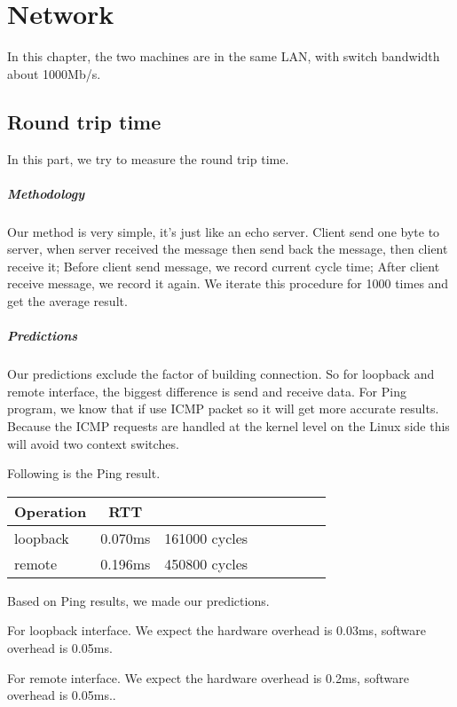 \chapter{Network}
In this chapter, the two machines are in the same LAN, with switch bandwidth about 1000Mb/s.

\section{Round trip time}
In this part, we try to measure the round trip time.

\paragraph{Methodology}
Our method is very simple, it's just like an echo server. Client send one byte to server, when server received the message then send back the message, then client receive it;
Before client send message, we record current cycle time; After client receive message, we record it again. We iterate this procedure for 1000 times and get the average result.


\paragraph{Predictions}
Our predictions exclude the factor of building connection. So for loopback and remote interface, the biggest difference is send and receive data.
For Ping program, we know that if use ICMP packet so it will get more accurate results. Because the ICMP requests are handled at the kernel level on the Linux side this will avoid two context switches.

Following is the Ping result.
\begin{center}
\begin{tabular}{l*{6}{c}r}
Operation       &  RTT \\
\hline
loopback & 0.070ms & 161000 cycles\\
remote & 0.196ms &  450800 cycles\\
\end{tabular}
\end{center}

Based on Ping results, we made our predictions.

For loopback interface. We expect the hardware overhead is 0.03ms, software overhead is 0.05ms.

For remote interface. We expect the hardware overhead is 0.2ms, software overhead is 0.05ms..

